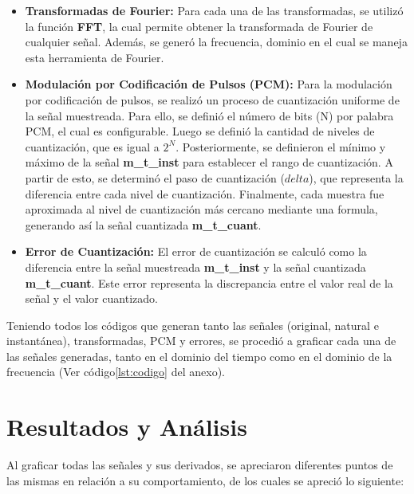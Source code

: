 \documentclass[12pt]{article}
\begin{document}
\begin{itemize}
    \item \textbf{Transformadas de Fourier:} Para cada una de las transformadas, se utilizó la función \textbf{FFT}, la cual permite obtener la transformada de Fourier de cualquier señal. Además, se generó la frecuencia, dominio en el cual se maneja esta herramienta de Fourier.

    \item \textbf{Modulación por Codificación de Pulsos (PCM):} Para la modulación por codificación de pulsos, se realizó un proceso de 
    cuantización uniforme de la señal muestreada. Para ello, se definió el número de bits (N) por palabra PCM, el cual es configurable.
    Luego se definió la cantidad de niveles de cuantización, que es igual a $2^N$. Posteriormente, se definieron el mínimo y máximo de 
    la señal \textbf{m\_t\_inst} para establecer el rango de cuantización. A partir de esto, se determinó el paso de cuantización ($delta$), 
    que representa la diferencia entre cada nivel de cuantización. Finalmente, cada muestra fue aproximada al nivel de cuantización más cercano 
    mediante una formula, generando así la señal cuantizada \textbf{m\_t\_cuant}.

    \item \textbf{Error de Cuantización:} El error de cuantización se calculó como la diferencia entre la señal muestreada \textbf{m\_t\_inst} y la señal cuantizada \textbf{m\_t\_cuant}. Este error representa la discrepancia entre el valor real de la señal y el valor cuantizado.
    
\end{itemize}

Teniendo todos los códigos que generan tanto las señales (original, natural e instantánea), transformadas, PCM y errores, se procedió a graficar cada una de las señales generadas, tanto en el dominio del tiempo como en el dominio de la frecuencia (Ver código\ref{lst:codigo} del anexo).

\newpage

\section{Resultados y Análisis}
Al graficar todas las señales y sus derivados, se apreciaron diferentes puntos de las mismas en relación a su comportamiento, de los cuales se apreció lo siguiente:
\end{document}
